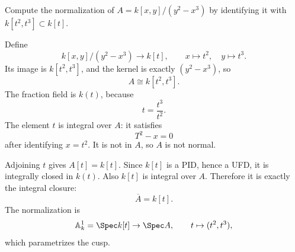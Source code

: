 \begin{problem}\label{prob:vi28-04}
Compute the normalization of \(A=k[x,y]/(y^2-x^3)\) by identifying it with \(k[t^2,t^3]\subset k[t]\).

\end{problem}

\ifdefined\FullProblemDossiers
\begin{solution}
Define
\[
k[x,y]/(y^2-x^3)\longrightarrow k[t],\qquad x\mapsto t^2,\quad y\mapsto t^3.
\]
Its image is \(k[t^2,t^3]\), and the kernel is exactly \((y^2-x^3)\), so
\[
A\cong k[t^2,t^3].
\]
The fraction field is \(k(t)\), because
\[
t=\frac{t^3}{t^2}.
\]
The element \(t\) is integral over \(A\): it satisfies
\[
T^2-x=0
\]
after identifying \(x=t^2\). It is not in \(A\), so \(A\) is not normal.

Adjoining \(t\) gives \(A[t]=k[t]\). Since \(k[t]\) is a PID, hence a UFD, it is integrally closed in \(k(t)\). Also \(k[t]\) is integral over \(A\). Therefore it is exactly the integral closure:
\[
\overline A=k[t].
\]
The normalization is
\[
\mathbb A^1_k=\Spec k[t]\to\Spec A,
\qquad t\mapsto(t^2,t^3),
\]
which parametrizes the cusp.
\end{solution}
\fi
